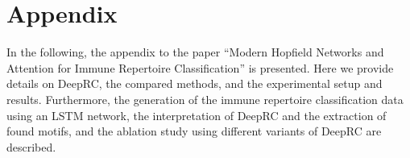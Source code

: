 \documentclass[oneside]{book}
\begin{document}
\newpage


\chapter*{Appendix}

In the following, the appendix to the
paper ``Modern Hopfield Networks and Attention for Immune Repertoire Classification'' is presented.
%
Here we provide details on DeepRC,
the compared methods, and the experimental setup and results.
Furthermore,
the generation of the immune repertoire classification data using an LSTM network,
the interpretation of DeepRC and the extraction of found motifs,
and the ablation study using different variants of DeepRC
are described.
%

\newpage

\renewcommand{\contentsname}{\Large Contents of Appendix \vspace{-1.5cm}}
\setcounter{tocdepth}{2}
\begingroup
\let\clearpage\relax
\vspace{-2cm} 
\tableofcontents

%

%

%

%

\vspace{-1.8cm} 

\renewcommand{\listfigurename}{\Large List of figures 
\vspace{-1.8cm}}
\listoffigures

\vspace{-1.8cm} 

\renewcommand{\listtablename}{\Large List of tables \vspace{-1.8cm}}
\listoftables

\endgroup






%

%

%

%

%
    
%


%


%

%



%

%

%

%

%
\end{document}
